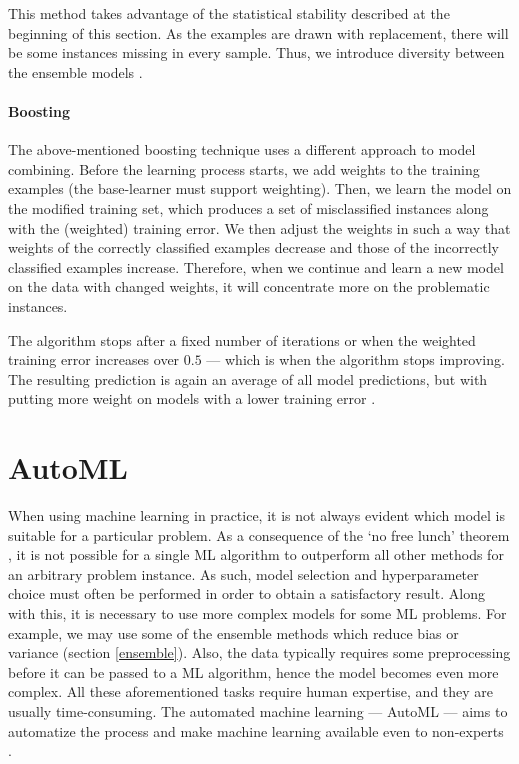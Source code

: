 This method takes advantage of the statistical stability described at the
beginning of this section. As the examples are drawn with replacement, there
will be some instances missing in every sample. Thus, we introduce diversity
between the ensemble models \citep[331]{Flach:2012:MLA:2490546}.

\paragraph{Boosting} \label{boosting}
The above-mentioned boosting technique uses a different approach to model
combining. Before the learning process starts, we add weights to the training 
examples (the base-learner must support weighting). Then, we learn the model
on the modified training set, which produces a set of misclassified instances
along with the (weighted) training error. We then adjust the weights in such a
way that weights of the correctly classified examples decrease and those of
the incorrectly classified examples increase. Therefore, when we continue and
learn a new model on the data with changed weights, it will concentrate more 
on the problematic instances.

The algorithm stops after a fixed number of iterations or when the weighted
training error increases over $0.5$ --- which is when the algorithm stops
improving. The resulting prediction is again an average of all model
predictions, but with putting more weight on models with a lower training
error \citep[335]{Flach:2012:MLA:2490546}.

\section{AutoML} \label{sec:automl}
When using machine learning in practice, it is not always evident which model
is suitable for a particular problem. As a consequence of the `no free lunch'
theorem \citep{585893}, it is not possible for a single ML algorithm to
outperform all other methods for an arbitrary problem instance. As such, model
selection and hyperparameter choice must often be performed in order to obtain a 
satisfactory result. Along with this, it is necessary to use more complex
models for some ML problems. For example, we may use some of the ensemble
methods which reduce bias or variance (section \ref{ensemble}). Also, the data
typically requires some preprocessing before it can be passed to a ML
algorithm, hence the model becomes even more complex. All these aforementioned
tasks require human expertise, and they are usually time-consuming. The automated
machine learning --- AutoML --- aims to automatize the process and make
machine learning available even to non-experts \citep{Zller2019SurveyOA}.

